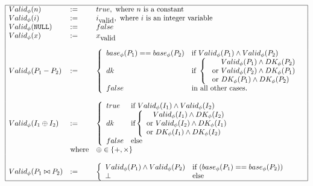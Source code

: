 $$
\begin{array}{|lll|}
\hline
 \isvalid{\phi}{n} & := & \true, \mbox{ where} \ n \mbox{ is a constant} \\
\isvalid{\phi}{i} & := & \ival{i}, \mbox{ where}\ i \mbox{ is an integer variable} \\
\isvalid{\phi}{\NULL} & := & \false \\
\isvalid{\phi}{x} &:=& \ival{x} \\
&&\\
\isvalid{\phi}{P_1-P_2} & :=& \left \lbrace \begin{array}{ll}
 \base{\phi}{P_1}==\base{\phi}{P_2} & \mbox{if } \isvalid{\phi}{P_1} \wedge \isvalid{\phi}{P_2} \\
\dk & \mbox{if } 
\left \lbrace \begin{array}{l} \phantom{\mbox{ or }}\isvalid{\phi}{P_1} \wedge \DK{\phi}{P_2} \\ 
\mbox{ or } \isvalid{\phi}{P_2}\wedge \DK{\phi}{P_1}  \\
\mbox{ or } \DK{\phi}{P_1} \wedge \DK{\phi}{P_2} \\\end{array} \right .\\ 
\false & \mbox{in all other cases.} 
\end{array} \right . \\
&&\\
\isvalid{\phi}{I_1\oplus I_2} & := & \left \lbrace \begin{array}{ll} 
 \true & \mbox{if } \isvalid{\phi}{I_1}\wedge \isvalid{\phi}{I_2} \\
 \dk & \mbox{if} 
   \left \lbrace 
    \begin{array}{l} \phantom{\mbox{or}} \isvalid{\phi}{I_1} \wedge \DK{\phi}{I_2} \\
    \mbox{or } \isvalid{\phi}{I_2}\wedge \DK{\phi}{I_1}  \\ 
    \mbox{or } \DK{\phi}{I_1} \wedge \DK{\phi}{I_2}  \\
 \end{array} \right . \\
 \false & \mbox{else} \\ \end{array} \right . \\
& \mbox{where} & \oplus \in \lbrace + , \times  \rbrace \\
&&\\
\isvalid{\phi}{P_1 \bowtie P_2} &:=& \left \lbrace \begin{array}{ll} 
	\isvalid{\phi}{P_1} \wedge \isvalid{\phi}{P_2} & \mbox{if } (\base{\phi}{P_1} == \base{\phi}{P_2}) \\
\bot & \mbox{else} 
\end{array} \right .\\
\hline
\end{array}
$$

